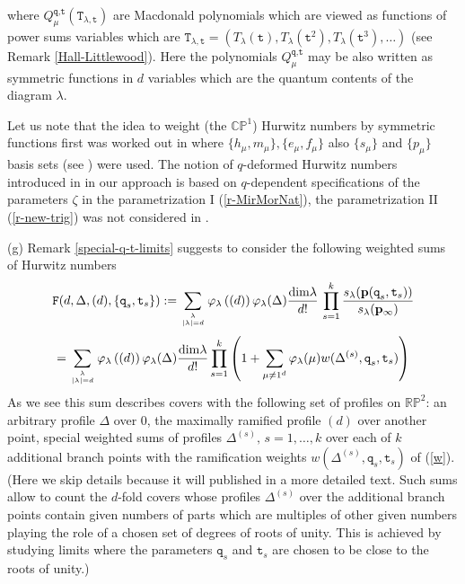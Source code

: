 \documentclass[a4paper,10pt]{article}
\newcommand{\bpow}{\mathbf{p}}
\theoremstyle{plain}
\theoremstyle{remark}
\def\be{\begin{equation}}
\def\ee{\end{equation}}
\begin{document}
where $Q_\mu^{\texttt{q},\texttt{t}}(\texttt{T}_{\lambda,\texttt{t}})$ are Macdonald polynomials which are viewed as
functions of power sums variables which are $\texttt{T}_{\lambda,\texttt{t}} =
\left(T_\lambda(\texttt{t}), T_\lambda(\texttt{t}^2), T_\lambda(\texttt{t}^3),\dots \right)$ (see Remark \ref{Hall-Littlewood}).
Here the polynomials $Q^{\texttt{q},\texttt{t}}_\mu$ may be also written as symmetric functions in $d$ variables which are the
quantum contents of the diagram $\lambda$.


Let us note that the idea to weight (the $\mathbb{CP}^1$) Hurwitz numbers by symmetric functions first was worked out in
\cite{HarnadMathieu-sept-2014} where $\{h_\mu,m_\mu\}, \{e_\mu,f_\mu\}$ also $\{s_\mu\}$ and $\{p_\mu\}$ basis sets
(see \cite{Mac}) were
used. The notion of $q$-deformed Hurwitz numbers introduced in \cite{HarnadMathieu-sept-2014} in our approach
is based on  $q$-dependent specifications of the parameters $\zeta$ in the parametrization I (\ref{r-MirMorNat}), the parametrization II
 (\ref{r-new-trig}) was not considered in \cite{HarnadMathieu-sept-2014}.

(g) Remark \ref{special-q-t-limits} suggests to consider the following weighted sums of Hurwitz numbers
\[
\texttt{F}(d,\Delta,(d),\{\texttt{q}_s,\texttt{t}_s\}) :=
\sum_{\lambda\atop |\lambda|=d} \varphi_\lambda\left((d)\right)
\varphi_\lambda(\Delta)\frac{{\rm dim}\lambda}{d!}\,
\prod_{s=1}^k
\frac{s_\lambda(\bpow(\texttt{q}_s,\texttt{t}_s))}{s_\lambda(\bpow_\infty)}
\]
\be\label{F}
=\sum_{\lambda\atop{|\lambda|=d}}
\varphi_\lambda\left((d)\right)
\varphi_\lambda(\Delta)\frac{{\rm dim}\lambda}{d!}
\prod_{s=1}^k
\left(1+\sum_{\mu\neq 1^d} \varphi_\lambda(\mu) w(\Delta^{(s)}, \texttt{q}_s,\texttt{t}_s)\right)
\ee
As we see this sum describes covers with the following set of profiles on $\mathbb{RP}^2$: an arbitrary
profile $\Delta$ over $0$, the maximally ramified profile $(d)$ over another point, special weighted sums of
profiles $\Delta^{(s)},\,s=1,\dots,k$ over each of
$k$ additional branch points with the ramification weights $w(\Delta^{(s)}, \texttt{q}_s,\texttt{t}_s)$ of (\ref{w}).
(Here we skip details because
it will published in a more detailed text.
 Such sums allow to count the $d$-fold covers whose profiles $\Delta^{(s)}$ over the additional branch points
 contain given numbers of parts which are multiples of other given numbers playing the role of a chosen set of degrees of roots of unity.
 This is achieved by studying limits where the parameters $\texttt{q}_s$ and $\texttt{t}_s$ are chosen to be close to the roots of unity.)
\end{document}
